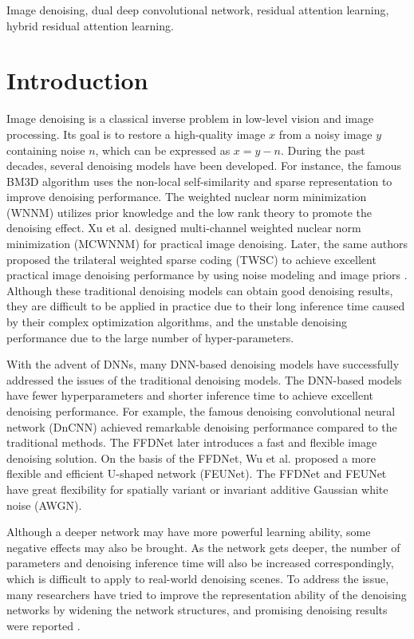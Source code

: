 \documentclass[3p,times]{elsarticle}
\begin{document}
\begin{frontmatter}
\begin{keyword}
Image denoising, dual deep convolutional network, residual attention learning, hybrid residual attention learning.
\end{keyword}

\end{frontmatter}

\section{Introduction}
Image denoising is a classical inverse problem in low-level vision and image processing. Its goal is to restore a high-quality image $x$ from a noisy image $y$ containing noise $n$, which can be expressed as $x = y - n$. During the past decades, several denoising models have been developed. For instance, the famous BM3D algorithm \cite{Dabov2007} uses the non-local self-similarity and sparse representation to improve denoising performance. The weighted nuclear norm minimization (WNNM) \cite{Gu2014} utilizes prior knowledge and the low rank theory to promote the denoising effect. Xu et al. \cite{Xu2017} designed multi-channel weighted nuclear norm minimization (MCWNNM) for practical image denoising. Later, the same authors proposed the trilateral weighted sparse coding (TWSC) to achieve excellent practical image denoising performance by using noise modeling and image priors \cite{Xu2018}. Although these traditional denoising models can obtain good denoising results, they are difficult to be applied in practice due to their long inference time caused by their complex optimization algorithms, and the unstable denoising performance due to the large number of hyper-parameters.

With the advent of DNNs, many DNN-based denoising models have successfully addressed the issues of the traditional denoising models. The DNN-based models have fewer hyperparameters and shorter inference time to achieve excellent denoising performance. For example, the famous denoising convolutional neural network (DnCNN) \cite{Zhang2017} achieved remarkable denoising performance compared to the traditional methods. The FFDNet \cite{Zhang2018} later introduces a fast and flexible image denoising solution. On the basis of the FFDNet, Wu et al. \cite{Wu2023} proposed a more flexible and efficient U-shaped network (FEUNet). The FFDNet and FEUNet have great flexibility for spatially variant or invariant additive Gaussian white noise (AWGN).

Although a deeper network may have more powerful learning ability, some negative effects may also be brought. As the network gets deeper, the number of parameters and denoising inference time will also be increased correspondingly, which is difficult to apply to real-world denoising scenes. To address the issue, many researchers have tried to improve the representation ability of the denoising networks by widening the network structures, and promising denoising results were reported \cite{Pan2018, Tian2020, Tian2021}.
\end{document}
